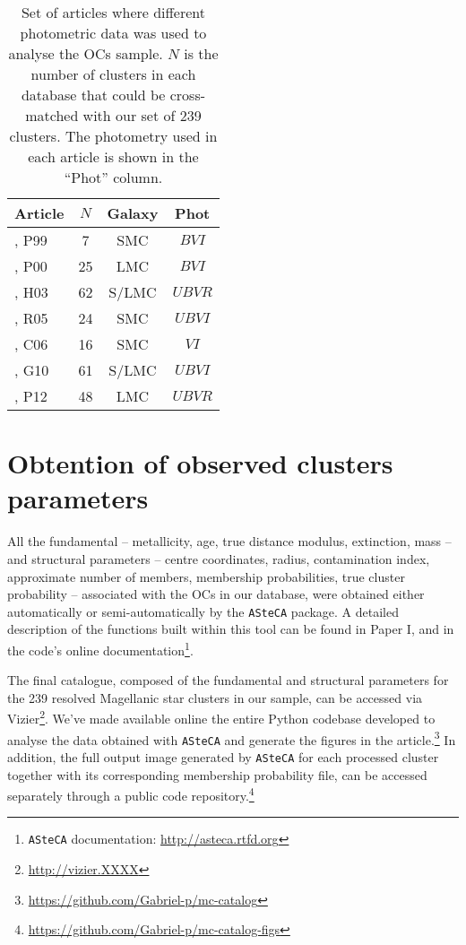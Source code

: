 \documentclass[a4paper,fleqn,usenatbib]{mnras}
\begin{document}
\begin{table}
\centering
  \caption{Set of articles where different photometric data was used to analyse
  the OCs sample.
  $N$ is the number of clusters in each database that could be cross-matched
  with our set of 239 clusters. The photometry used in each article is shown in
  the ``Phot'' column.}
\label{tab:databases}
 \begin{tabular}{l c c c}
\hline
Article & $N$ & Galaxy & Phot\\
\hline
\cite{Pietrzynski1999}, P99 & 7 & SMC & $BVI$ \\ 
\cite{Pietrzynski2000}, P00 & 25 & LMC & $BVI$ \\ 
\cite{Hunter_2003}, H03 & 62 & S/LMC & $UBVR$ \\ 
\cite{Rafelski_2005}, R05 & 24 & SMC & $UBVI$ \\ 
\cite{Chiosi_2006}, C06 & 16 & SMC & $VI$ \\ 
\cite{Glatt_2010}, G10 & 61 & S/LMC & $UBVI$ \\ 
\cite{Popescu_2012}, P12 & 48 & LMC & $UBVR$ \\ 
\hline
 \end{tabular} 
\end{table}
  




\section{Obtention of observed clusters parameters}
\label{sec:fund-params}

All the fundamental -- metallicity, age, true distance modulus,
extinction, mass -- and structural parameters -- centre coordinates, radius,
contamination index, approximate number of members, membership probabilities,
true cluster probability -- associated with the OCs in our database, were
obtained either automatically or semi-automatically by the \texttt{ASteCA}
package.
%
A detailed description of the functions built within this tool can be found in
Paper I, and in the code's online documentation\footnote{\texttt{ASteCA}
documentation: \url{http://asteca.rtfd.org}}.
  
The final catalogue, composed of the fundamental and structural parameters for
the 239 resolved Magellanic star clusters in our sample, can be
accessed via Vizier\footnote{\url{http://vizier.XXXX}}.
We've made available online the entire Python codebase developed to analyse
the data obtained with \texttt{ASteCA} and generate the figures in the
article.\footnote{\url{https://github.com/Gabriel-p/mc-catalog}}
%
In addition, the full output image generated by \texttt{ASteCA} for each
processed cluster together with its corresponding membership probability file,
can be accessed separately through a public code
repository.\footnote{\url{https://github.com/Gabriel-p/mc-catalog-figs}}
\end{document}
